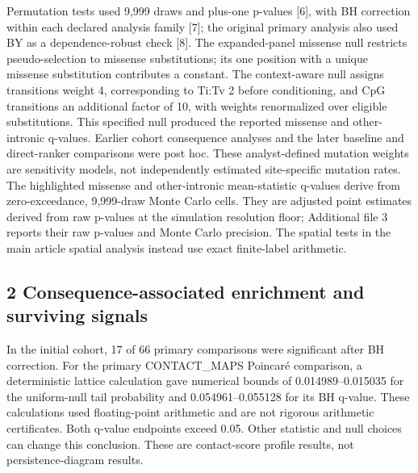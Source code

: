 \documentclass[
  11pt,
]{article}
\begin{document}
Permutation tests used 9,999 draws and plus-one p-values {[}6{]}, with
BH correction within each declared analysis family {[}7{]}; the original
primary analysis also used BY as a dependence-robust check {[}8{]}. The
expanded-panel missense null restricts pseudo-selection to missense
substitutions; its one position with a unique missense substitution
contributes a constant. The context-aware null assigns transitions
weight 4, corresponding to Ti:Tv 2 before conditioning, and CpG
transitions an additional factor of 10, with weights renormalized over
eligible substitutions. This specified null produced the reported
missense and other-intronic q-values. Earlier cohort consequence
analyses and the later baseline and direct-ranker comparisons were post
hoc. These analyst-defined mutation weights are sensitivity models, not
independently estimated site-specific mutation rates. The highlighted
missense and other-intronic mean-statistic q-values derive from
zero-exceedance, 9,999-draw Monte Carlo cells. They are adjusted point
estimates derived from raw p-values at the simulation resolution floor;
Additional file 3 reports their raw p-values and Monte Carlo precision.
The spatial tests in the main article spatial analysis instead use exact
finite-label arithmetic.

\subsection{2 Consequence-associated enrichment and surviving
signals}\label{consequence-associated-enrichment-and-surviving-signals}

In the initial cohort, 17 of 66 primary comparisons were significant
after BH correction. For the primary CONTACT\_MAPS Poincaré comparison,
a deterministic lattice calculation gave numerical bounds of
0.014989--0.015035 for the uniform-null tail probability and
0.054961--0.055128 for its BH q-value. These calculations used
floating-point arithmetic and are not rigorous arithmetic certificates.
Both q-value endpoints exceed 0.05. Other statistic and null choices can
change this conclusion. These are contact-score profile results, not
persistence-diagram results.
\end{document}
